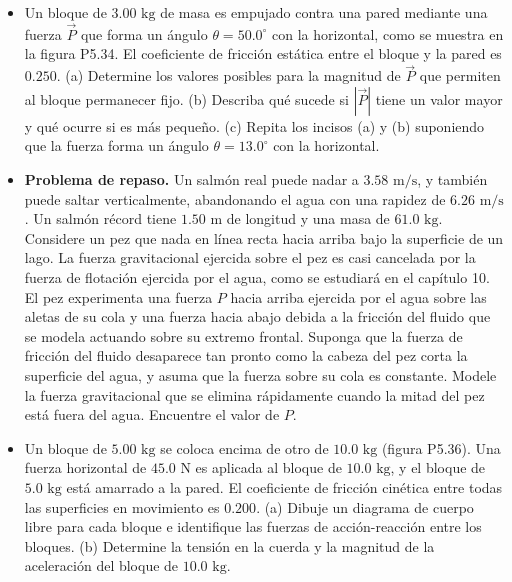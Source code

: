 \documentclass[11pt,a4paper]{article}
\begin{document}
\begin{itemize}
    \item[\textbf{34.}] Un bloque de $3.00 \text{ kg}$ de masa es empujado contra una pared mediante una fuerza $\vec{P}$ que forma un ángulo $\theta = 50.0^\circ$ con la horizontal, como se muestra en la figura P5.34. El coeficiente de fricción estática entre el bloque y la pared es $0.250$. (a) Determine los valores posibles para la magnitud de $\vec{P}$ que permiten al bloque permanecer fijo. (b) Describa qué sucede si $|\vec{P}|$ tiene un valor mayor y qué ocurre si es más pequeño. (c) Repita los incisos (a) y (b) suponiendo que la fuerza forma un ángulo $\theta = 13.0^\circ$ con la horizontal.
    \vspace*{8cm}

    \item[\textbf{35.}] \textbf{Problema de repaso.} Un salmón real puede nadar a $3.58 \text{ m/s}$, y también puede saltar verticalmente, abandonando el agua con una rapidez de $6.26 \text{ m/s}$. Un salmón récord tiene $1.50 \text{ m}$ de longitud y una masa de $61.0 \text{ kg}$. Considere un pez que nada en línea recta hacia arriba bajo la superficie de un lago. La fuerza gravitacional ejercida sobre el pez es casi cancelada por la fuerza de flotación ejercida por el agua, como se estudiará en el capítulo 10. El pez experimenta una fuerza $P$ hacia arriba ejercida por el agua sobre las aletas de su cola y una fuerza hacia abajo debida a la fricción del fluido que se modela actuando sobre su extremo frontal. Suponga que la fuerza de fricción del fluido desaparece tan pronto como la cabeza del pez corta la superficie del agua, y asuma que la fuerza sobre su cola es constante. Modele la fuerza gravitacional que se elimina rápidamente cuando la mitad del pez está fuera del agua. Encuentre el valor de $P$.
    \vspace*{6cm}

    \item[\textbf{36.}] Un bloque de $5.00 \text{ kg}$ se coloca encima de otro de $10.0 \text{ kg}$ (figura P5.36). Una fuerza horizontal de $45.0 \text{ N}$ es aplicada al bloque de $10.0 \text{ kg}$, y el bloque de $5.0 \text{ kg}$ está amarrado a la pared. El coeficiente de fricción cinética entre todas las superficies en movimiento es $0.200$. (a) Dibuje un diagrama de cuerpo libre para cada bloque e identifique las fuerzas de acción-reacción entre los bloques. (b) Determine la tensión en la cuerda y la magnitud de la aceleración del bloque de $10.0 \text{ kg}$.
    \vspace*{7cm}
\end{itemize}
\end{document}

